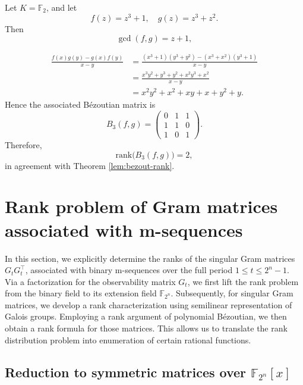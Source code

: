 \documentclass[hidelinks,onefignum,onetabnum]{siamart251216}
\theoremstyle{definition}
\theoremstyle{remark}
\providecommand{\rank}{{\mathrm{rank}}}
\begin{document}
\begin{example}
	Let $K=\mathbb F_2$, and let
	\[
	f(z)=z^3+1,\quad g(z)=z^3+z^2.
	\]
	Then
	\[
	\gcd(f,g)=z+1,
	\]
	
	
	\[
	\begin{aligned}
		\frac{f(x)g(y)-g(x)f(y)}{x-y}
		&=\frac{(x^3+1)(y^3+y^2)-(x^3+x^2)(y^3+1)}{x-y}\\
		&=\frac{x^3y^2+y^3+y^2+x^2y^3+x^2}{x-y}\\
		&=x^2y^2+x^2+xy+x+y^2+y.
	\end{aligned}
	\]
	Hence the associated B\'ezoutian matrix is
	\[
	B_3(f,g)=
	\begin{pmatrix}
		0 & 1 & 1\\
		1 & 1 & 0\\
		1 & 0 & 1
	\end{pmatrix}.
	\]
Therefore,
	\[
	\rank\bigl(B_3(f,g)\bigr)=2,
	\]
	in agreement with Theorem \ref{lem:bezout-rank}.
\end{example}

\section{Rank problem of Gram matrices associated with m-sequences}\label{sec-main result}

In this section, we explicitly determine the ranks of the singular Gram matrices $G_t G_t^\top$, associated with binary m-sequences over the full period $1 \le t \le 2^n - 1$. Via a factorization for the observability matrix $G_t$, we first lift the rank problem from the binary field to its extension field $\mathbb{F}_{2^n}$. Subsequently, for singular Gram matrices, we develop a rank characterization using semilinear representation of Galois groups. Employing a rank argument of polynomial B{\'e}zoutian, we then obtain a rank formula for those matrices. This allows us to translate the rank distribution problem into enumeration of certain rational functions.





\subsection{Reduction to symmetric matrices over $\mathbb{F}_{2^n}[x]$}
\end{document}
